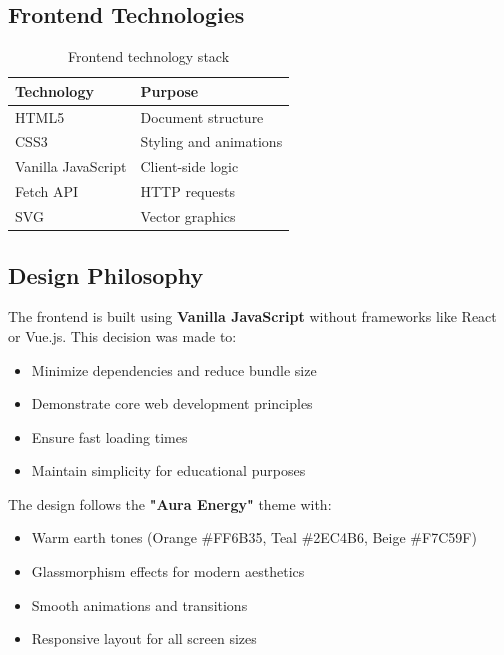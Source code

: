 \documentclass[12pt,a4paper]{article}
\begin{document}
\subsection{Frontend Technologies}

\begin{table}[H]
\centering
\begin{tabular}{@{}ll@{}}
\toprule
\textbf{Technology} & \textbf{Purpose} \\ \midrule
HTML5 & Document structure \\
CSS3 & Styling and animations \\
Vanilla JavaScript & Client-side logic \\
Fetch API & HTTP requests \\
SVG & Vector graphics \\ \bottomrule
\end{tabular}
\caption{Frontend technology stack}
\label{tab:frontend-stack}
\end{table}

\subsection{Design Philosophy}

The frontend is built using \textbf{Vanilla JavaScript} without frameworks like React or Vue.js. This decision was made to:
\begin{itemize}[leftmargin=*]
    \item Minimize dependencies and reduce bundle size
    \item Demonstrate core web development principles
    \item Ensure fast loading times
    \item Maintain simplicity for educational purposes
\end{itemize}

The design follows the \textbf{"Aura Energy"} theme with:
\begin{itemize}[leftmargin=*]
    \item Warm earth tones (Orange \#FF6B35, Teal \#2EC4B6, Beige \#F7C59F)
    \item Glassmorphism effects for modern aesthetics
    \item Smooth animations and transitions
    \item Responsive layout for all screen sizes
\end{itemize}

\end{document}
